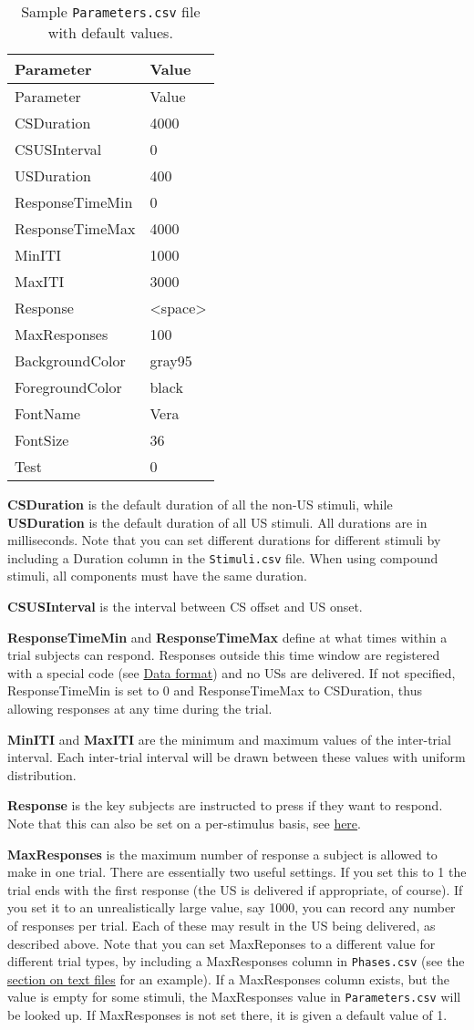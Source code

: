 \documentclass[11pt,]{article}
\begin{document}
\begin{longtable}[c]{@{}ll@{}}
\caption{Sample \texttt{Parameters.csv} file with default
values.}\tabularnewline
\toprule
Parameter & Value\tabularnewline
\midrule
\endfirsthead
\toprule
Parameter & Value\tabularnewline
\midrule
\endhead
CSDuration & 4000\tabularnewline
CSUSInterval & 0\tabularnewline
USDuration & 400\tabularnewline
ResponseTimeMin & 0\tabularnewline
ResponseTimeMax & 4000\tabularnewline
MinITI & 1000\tabularnewline
MaxITI & 3000\tabularnewline
Response & \textless{}space\textgreater{}\tabularnewline
MaxResponses & 100\tabularnewline
BackgroundColor & gray95\tabularnewline
ForegroundColor & black\tabularnewline
FontName & Vera\tabularnewline
FontSize & 36\tabularnewline
Test & 0\tabularnewline
\bottomrule
\end{longtable}

\textbf{CSDuration} is the default duration of all the non-US stimuli,
while \textbf{USDuration} is the default duration of all US stimuli. All
durations are in milliseconds. Note that you can set different durations
for different stimuli by including a Duration column in the
\texttt{Stimuli.csv} file. When using compound stimuli, all components
must have the same duration.

\textbf{CSUSInterval} is the interval between CS offset and US onset.

\textbf{ResponseTimeMin} and \textbf{ResponseTimeMax} define at what
times within a trial subjects can respond. Responses outside this time
window are registered with a special code (see
\hyperref[data-format]{Data format}) and no USs are delivered. If not
specified, ResponseTimeMin is set to 0 and ResponseTimeMax to
CSDuration, thus allowing responses at any time during the trial.

\textbf{MinITI} and \textbf{MaxITI} are the minimum and maximum values
of the inter-trial interval. Each inter-trial interval will be drawn
between these values with uniform distribution.

\textbf{Response} is the key subjects are instructed to press if they
want to respond. Note that this can also be set on a per-stimulus basis,
see \hyperref[responses]{here}.

\label{maxresponses} \textbf{MaxResponses} is the maximum number of
response a subject is allowed to make in one trial. There are
essentially two useful settings. If you set this to 1 the trial ends
with the first response (the US is delivered if appropriate, of course).
If you set it to an unrealistically large value, say 1000, you can
record any number of responses per trial. Each of these may result in
the US being delivered, as described above. Note that you can set
MaxReponses to a different value for different trial types, by including
a MaxResponses column in \texttt{Phases.csv} (see the
\hyperref[textfiles]{section on text files} for an example). If a
MaxResponses column exists, but the value is empty for some stimuli, the
MaxResponses value in \texttt{Parameters.csv} will be looked up. If
MaxResponses is not set there, it is given a default value of 1.
\end{document}
